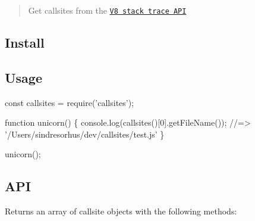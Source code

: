 \begin{quote}
Get callsites from the \href{https://github.com/v8/v8/wiki/Stack-Trace-API}{\tt V8 stack trace A\+PI} \end{quote}


\subsection*{Install}




\subsection*{Usage}


\begin{DoxyCode}
const callsites = require('callsites');

function unicorn() \{
    console.log(callsites()[0].getFileName());
    //=> '/Users/sindresorhus/dev/callsites/test.js'
\}

unicorn();
\end{DoxyCode}


\subsection*{A\+PI}

Returns an array of callsite objects with the following methods\+:


